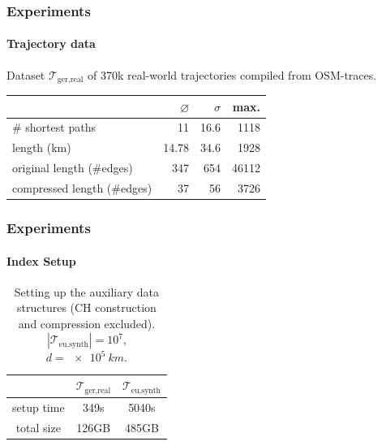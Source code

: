 \documentclass{beamer}
\newcommand{\traj}[2]{\mathcal{T}_{\text{#1},\text{#2}}}
\begin{document}
\begin{frame}
	\frametitle{Experiments}
	\framesubtitle{Trajectory data}
	Dataset $\traj{ger}{real}$ of 370k real-world trajectories compiled from OSM-traces.
	\begin{table}
		{
			\begin{tabular}{|l|rrr|}
				\hline
				                            & $\varnothing$ & $\sigma$ & max.  \\
				\hline
				\# shortest paths           & 11            & 16.6     & 1118  \\
				length (km)                 & 14.78         & 34.6     & 1928  \\
				original length (\#edges)   & 347           & 654      & 46112 \\
				compressed length (\#edges) & 37            & 56       & 3726  \\
				\hline
			\end{tabular}
		}
	\end{table}
\end{frame}


\begin{frame}
	\frametitle{Experiments}
	\framesubtitle{Index Setup}
	\begin{table}
		{
			\caption{Setting up the auxiliary data structures (CH construction and compression excluded). $|\traj{eu}{synth}| = 10^7$, $d=\SI{e5}{km}$.
			}
			\begin{tabular}{|c|cc|}
				\hline
				           & $\traj{ger}{real}$ & $\traj{eu}{synth}$ \\
				\hline
				setup time & 349s               & 5040s              \\
				total size & 126GB              & 485GB              \\
				\hline
			\end{tabular}
		}

	\end{table}
\end{frame}
\end{document}
